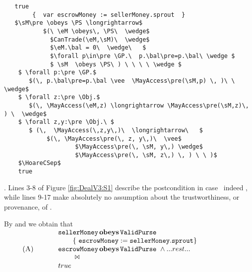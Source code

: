 
\begin{figure*} 
\begin{lstlisting}
   true
        {  var escrowMoney := sellerMoney.sprout  }
   $\sM\pre \obeys \PS \longrightarrow$ 
           $(\ \eM \obeys\, \PS\  \wedge$  
             $CanTrade(\eM,\sM)\  \wedge$
             $\eM.\bal = 0\  \wedge\   $
             $\forall p\in\pre \GP.\  p.\bal\pre=p.\bal\ \wedge $
             $ \sM  \obeys \PS\ ) \ \ \ \ \wedge $
    $ \forall p:\pre \GP.$
       $(\, p.\bal\pre=p.\bal \vee  \MayAccess\pre(\sM,p) \, )\ \ \wedge$
    $ \forall z:\pre \Obj.$
       $(\, \MayAccess(\eM,z) \longrightarrow \MayAccess\pre(\sM,z)\, ) \  \wedge$
    $ \forall z,y:\pre \Obj.\ $
       $ (\,  \MayAccess(\,z,y\,)\  \longrightarrow\   $
            $(\, \MayAccess\pre(\, z, y\,)\  \vee$
                    $\MayAccess\pre(\, \sM, y\,) \wedge$
                    $\MayAccess\pre(\, \sM, z\,) \, ) \ \ )$
    $\HoareCSep$
    true
   \end{lstlisting}
\caption{Hoare tuple for first step in }
\label{fig:DealV3:S1}
\end{figure*}


%
. 
Lines 3-8 of Figure \ref{fig:DealV3:S1} describe the postcondition in case  \eM\ indeed \obeys \PS, while lines 9-17 make absolutely no assumption
about the trustworthiness, or provenance, of \eM.

\noindent

\noindent
By   and  we obtain that \\
$  %
  \HoareNLSP {A}
      {\sM \obeys  \PS}
       {\eM:=\sM.\prg{sprout}}
      { \eM  \obeys  \PS\  \wedge  ... rest ...} 
         {\true} %
$

